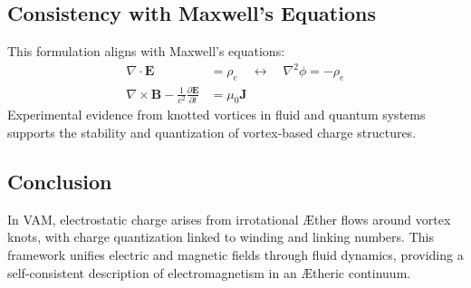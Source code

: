 \subsection{Consistency with Maxwell's Equations}


This formulation aligns with Maxwell's equations:
\begin{align}
    \nabla \cdot \mathbf{E} &= \rho_e \quad \leftrightarrow \quad \nabla^2 \phi = -\rho_e \\
    \nabla \times \mathbf{B} - \frac{1}{c^2}\frac{\partial \mathbf{E}}{\partial t} &= \mu_0 \mathbf{J}
\end{align}
Experimental evidence from knotted vortices in fluid and quantum systems supports the stability and quantization of vortex-based charge structures.


\subsection{Conclusion}


In VAM, electrostatic charge arises from irrotational Æther flows around vortex knots, with charge quantization linked to winding and linking numbers. This framework unifies electric and magnetic fields through fluid dynamics, providing a self-consistent description of electromagnetism in an Ætheric continuum.